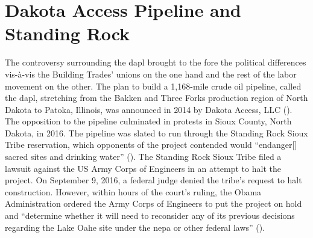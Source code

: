 

\section{Dakota Access Pipeline and Standing Rock}\label{dapl}

The controversy surrounding the \acrfull{dapl} brought to the fore the political differences vis-\`a-vis the Building Trades' unions on the one hand and the rest of the labor movement on the other. The plan to build a 1,168-mile crude oil pipeline, called the \acrshort{dapl}, stretching from the Bakken and Three Forks production region of North Dakota to Patoka, Illinois, was announced in 2014 by Dakota Access, LLC (\cite{oconnellDakotaAccessPipeline2018, sahaFiveThingsKnow2016, usarmycorpsofengineersDakotaAccessPipeline}). The opposition to the pipeline culminated in protests in Sioux County, North Dakota, in 2016. The pipeline was slated to run through the Standing Rock Sioux Tribe reservation, which opponents of the project contended would “endanger[] sacred sites and drinking water” (\cite{sahaFiveThingsKnow2016}). The Standing Rock Sioux Tribe filed a lawsuit against the US Army Corps of Engineers in an attempt to halt the project. On September 9, 2016, a federal judge denied the tribe’s request to halt construction. However, within hours of the court’s ruling, the Obama Administration ordered the Army Corps of Engineers to put the project on hold and “determine whether it will need to reconsider any of its previous decisions regarding the Lake Oahe site under the \acrfull{nepa} or other federal laws” (\cite{officeofpublicaffairsJointStatementDepartment2016}). 


